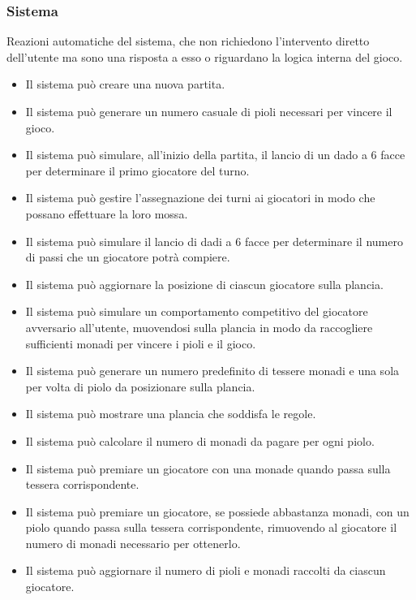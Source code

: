 \subsubsection{Sistema} \label{sec:functional-requirements:system}
Reazioni automatiche del sistema, che non richiedono l'intervento
diretto dell'utente ma sono una risposta a esso o riguardano la logica interna del gioco.
\begin{itemize}
      \item Il sistema può creare una nuova partita.
      \item Il sistema può generare un numero casuale di pioli necessari per vincere il gioco.
      \item Il sistema può simulare, all'inizio della partita, il lancio di un dado a 6 
            facce per determinare il primo giocatore del turno.
      \item Il sistema può gestire l'assegnazione dei turni ai giocatori in modo che possano
            effettuare la loro mossa.
      \item Il sistema può simulare il lancio di dadi a 6 facce per determinare il numero di
            passi che un giocatore potrà compiere.
      \item Il sistema può aggiornare la posizione di ciascun giocatore sulla plancia.
      \item Il sistema può simulare un comportamento competitivo del giocatore avversario 
            all'utente, muovendosi sulla plancia in modo da raccogliere sufficienti monadi
            per vincere i pioli e il gioco.
      \item Il sistema può generare un numero predefinito di tessere monadi e una sola per 
            volta di piolo da posizionare sulla plancia.
      \item Il sistema può mostrare una plancia che soddisfa le regole. 
      \item Il sistema può calcolare il numero di monadi da pagare per ogni piolo.
      \item Il sistema può premiare un giocatore con una monade quando passa sulla tessera 
            corrispondente.
      \item Il sistema può premiare un giocatore, se possiede abbastanza monadi, con un
            piolo quando passa sulla tessera corrispondente, rimuovendo al giocatore il
            numero di monadi necessario per ottenerlo.
      \item Il sistema può aggiornare il numero di pioli e monadi raccolti da ciascun giocatore.

\end{itemize}
